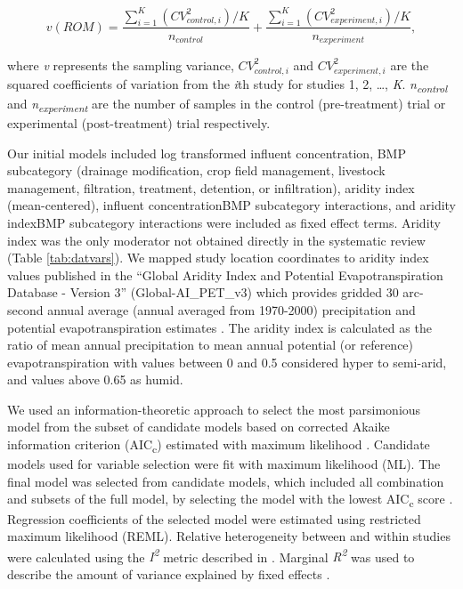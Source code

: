 \documentclass[utf8]{FrontiersinHarvard}
\begin{document}
\[
v(ROM) = \frac{\sum_{i=1}^{K}{(CV^2_{control,i})/K}}{n_{control}} + \frac{\sum_{i=1}^{K}{(CV^2_{experiment,i})/K}}{n_{experiment}},
\]

where \emph{v} represents the sampling variance, \(CV^2_{control,i}\) and \(CV^2_{experiment,i}\) are the squared coefficients of variation from the \emph{i}th study for studies 1, 2, \ldots, \emph{K}. \emph{n\textsubscript{control}} and \emph{n\textsubscript{experiment}} are the number of samples in the control (pre-treatment) trial or experimental (post-treatment) trial respectively.

Our initial models included log transformed influent concentration, BMP subcategory (drainage modification, crop field management, livestock management, filtration, treatment, detention, or infiltration), aridity index (mean-centered), influent concentration\texttimes BMP subcategory interactions, and aridity index\texttimes BMP subcategory interactions were included as fixed effect terms.
Aridity index was the only moderator not obtained directly in the systematic review (Table \ref{tab:datvars}).
We mapped study location coordinates to aridity index values published in the ``Global Aridity Index and Potential Evapotranspiration Database - Version 3'' (Global-AI\_PET\_v3) which provides gridded 30 arc-second annual average (annual averaged from 1970-2000) precipitation and potential evapotranspiration estimates \citep{zomerVersionGlobalAridity2022}.
The aridity index is calculated as the ratio of mean annual precipitation to mean annual potential (or reference) evapotranspiration with values between 0 and 0.5 considered hyper to semi-arid, and values above 0.65 as humid.

We used an information-theoretic approach to select the most parsimonious model from the subset of candidate models based on corrected Akaike information criterion (AIC\textsubscript{c}) estimated with maximum likelihood \citep{cinarUsingInformationTheoretic2021}.
Candidate models used for variable selection were fit with maximum likelihood (ML).
The final model was selected from candidate models, which included all combination and subsets of the full model, by selecting the model with the lowest AIC\textsubscript{c} score \citep{burnhamAICModelSelection2011, cinarUsingInformationTheoretic2021}.
Regression coefficients of the selected model were estimated using restricted maximum likelihood (REML).
Relative heterogeneity between and within studies were calculated using the \emph{I\textsuperscript{2}} metric described in \citet{nakagawaMethodologicalIssuesAdvances2012}.
Marginal \emph{R\textsuperscript{2}} was used to describe the amount of variance explained by fixed effects \citep{nakagawaGeneralSimpleMethod2013}.
\end{document}
